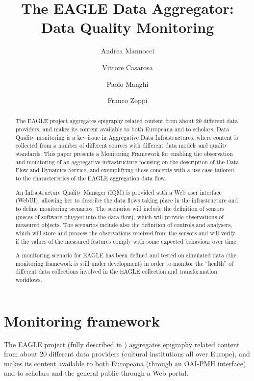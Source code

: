 \documentclass[amsthm,ebook]{saparticle}
\title{The EAGLE Data Aggregator:
Data Quality Monitoring}
\author[CNR-ISTI]{Andrea Mannocci\corref{all}}
\author[CNR-ISTI]{Vittore Casarosa}
\author[CNR-ISTI]{Paolo Manghi}
\author[CNR-ISTI]{Franco Zoppi}
\begin{document}
\maketitle

\begin{abstract}
The EAGLE project aggregates epigraphy related content from about 20 different data providers, and makes its content available to both Europeana and to scholars. Data Quality monitoring is a key issue in Aggregative Data Infrastructures, where content is collected from a number of different sources with different data models and quality standards. This paper presents a Monitoring Framework for enabling the observation and monitoring of an aggregative infrastructure focusing on the description of the Data Flow and Dynamics Service, and exemplifying these concepts with a use case tailored to the characteristics of the EAGLE aggregation data flow.

An Infrastructure Quality Manager (IQM) is provided with a Web user interface (WebUI), allowing her to describe the data flows taking place in the infrastructure and to define monitoring scenarios. The scenarios will include the definition of sensors (pieces of software plugged into the data flow), which will provide observations of measured objects. The scenarios include also the definition of controls and analysers, which will store and process the observations received from the sensors and will verify if the values of the measured features comply with some expected behaviour over time. 

A monitoring scenario for EAGLE has been defined and tested on simulated data (the monitoring framework is still under development) in order to monitor the ``health'' of different data collections involved in the EAGLE collection and transformation workflows.  

\end{abstract}


\section{Monitoring framework}\label{framework}

The EAGLE project (fully described in \citep{eagle}) aggregates epigraphy related content from about 20 different data providers (cultural institutions all over Europe), and makes its content available to both Europeana \citep{europeana} (through an OAI-PMH interface) and to scholars and the general public through a Web portal.
\end{document}
